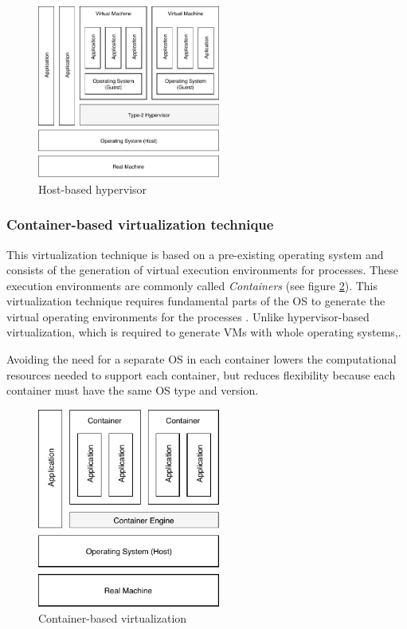 	\begin{figure}[H]
		\centering
		\includegraphics[width=6cm]{images/hosted-BasedHypervisor.pdf}
		\vspace{-0.2cm}
		\caption{Host-based hypervisor}
		\label{fig:host-basedHypervisor}
	\end{figure}
	
	\subsubsection {Container-based virtualization technique}
	
	This virtualization technique is based on a pre-existing operating system and consists of the generation of virtual execution environments for processes. 
	These execution environments are commonly called \textit{Containers} (see figure \ref{fig:container-baseVirtualization}). This virtualization technique requires fundamental parts of the OS to generate the virtual operating environments for the processes \cite{Kon2017}.
	Unlike hypervisor-based virtualization, which is required to generate VMs with whole operating systems,\cite{Kon2017}. 
	
	
	Avoiding the need for a separate OS in each container lowers the computational resources needed to support each container, but reduces flexibility because each container must have the same OS type and version. 

	\begin{figure}[H]
		\centering
		\includegraphics[width=6cm]{images/container-BasedVirtualization.pdf}
		\vspace{-0.2cm}
		\caption{Container-based virtualization}
		\label{fig:container-baseVirtualization}
	\end{figure}
	